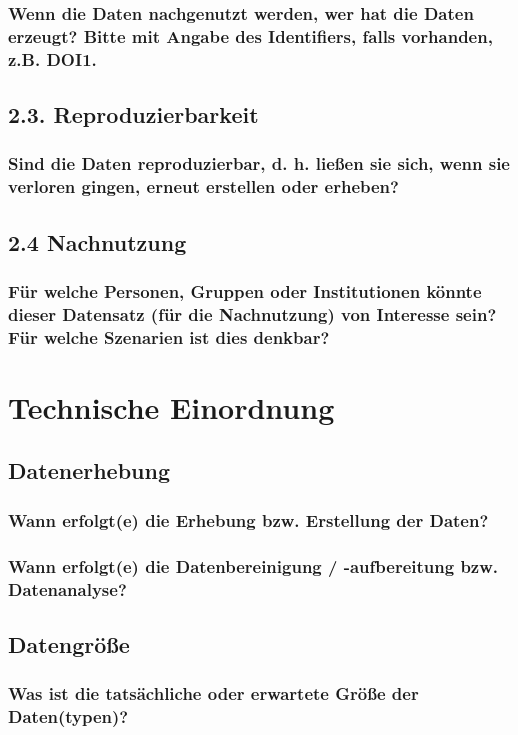 \subsubsection*{Wenn die Daten nachgenutzt werden, wer hat die Daten erzeugt? Bitte mit Angabe des Identifiers, falls vorhanden, z.B. DOI1.}
\subsection*{2.3. Reproduzierbarkeit}
\subsubsection*{Sind die Daten reproduzierbar, d. h. ließen sie sich, wenn sie verloren gingen, erneut erstellen oder erheben?}
\subsection*{2.4 Nachnutzung}
\subsubsection*{Für welche Personen, Gruppen oder Institutionen könnte dieser Datensatz (für die Nachnutzung) von Interesse sein? Für welche Szenarien ist dies denkbar?}

\section{Technische Einordnung}
\subsection*{Datenerhebung}
\subsubsection*{Wann erfolgt(e) die Erhebung bzw. Erstellung der Daten?}
\subsubsection*{Wann erfolgt(e) die Datenbereinigung / -aufbereitung bzw. Datenanalyse?}
\subsection*{Datengröße}
\subsubsection*{Was ist die tatsächliche oder erwartete Größe der Daten(typen)?}
